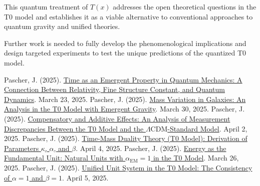 \documentclass[12pt,a4paper]{article}
\newcommand{\Tfield}{T(x)}
\newcommand{\alphaEM}{\alpha_{\text{EM}}}
\newcommand{\LCDM}{\Lambda\text{CDM}}
\begin{document}
	This quantum treatment of $\Tfield$ addresses the open theoretical questions in the T0 model and establishes it as a viable alternative to conventional approaches to quantum gravity and unified theories.
	
	Further work is needed to fully develop the phenomenological implications and design targeted experiments to test the unique predictions of the quantized T0 model.
	

	
	\begin{thebibliography}{99}
		 Pascher, J. (2025). \href{https://github.com/jpascher/T0-Time-Mass-Duality/tree/main/2/pdf/English/Zeit\%20als\%20emergente\%20Eigenschaft\%20in\%20der\%20Quantenmechanik_en.pdf}{Time as an Emergent Property in Quantum Mechanics: A Connection Between Relativity, Fine Structure Constant, and Quantum Dynamics}. March 23, 2025.
		 Pascher, J. (2025). \href{https://github.com/jpascher/T0-Time-Mass-Duality/tree/main/2/pdf/English/Massenvariation\%20in\%20Galaxien_en.pdf}{Mass Variation in Galaxies: An Analysis in the T0 Model with Emergent Gravity}. March 30, 2025.
		 Pascher, J. (2025). \href{https://github.com/jpascher/T0-Time-Mass-Duality/tree/main/2/pdf/English/Analyse\%20der\%20Messdifferenzen\%20zwischen\%20dem\%20T0-Modell\%20und\%20dem\%20Standardmodell_en.pdf}{Compensatory and Additive Effects: An Analysis of Measurement Discrepancies Between the T0 Model and the \(\LCDM\)-Standard Model}. April 2, 2025.
		 Pascher, J. (2025). \href{https://github.com/jpascher/T0-Time-Mass-Duality/tree/main/2/pdf/English/Zeit-Masse-Dualit\%C3\%A4tstheorie\%20(T0-Modell)\%20Herleitung\%20der\%20Parameter\%20kappa,\%20alpha\%20und\%20beta_en.pdf}{Time-Mass Duality Theory (T0 Model): Derivation of Parameters \(\kappa\), \(\alpha\), and \(\beta\)}. April 4, 2025.
		 Pascher, J. (2025). \href{https://github.com/jpascher/T0-Time-Mass-Duality/tree/main/2/pdf/English/Nat\%C3\%BCrliche\%20Einheiten\%20mit\%20Feinstrukturkonstante\%20alpha\%20=\%201_en.pdf}{Energy as the Fundamental Unit: Natural Units with \(\alphaEM = 1\) in the T0 Model}. March 26, 2025.
		 Pascher, J. (2025). \href{https://github.com/jpascher/T0-Time-Mass-Duality/tree/main/2/pdf/English/Die\%20Konsistenz\%20von\%20alpha\%20=\%201\%20und\%20beta\%20=\%201_en.pdf}{Unified Unit System in the T0 Model: The Consistency of \(\alpha = 1\) and \(\beta = 1\)}. April 5, 2025.

\end{thebibliography}
\end{document}
